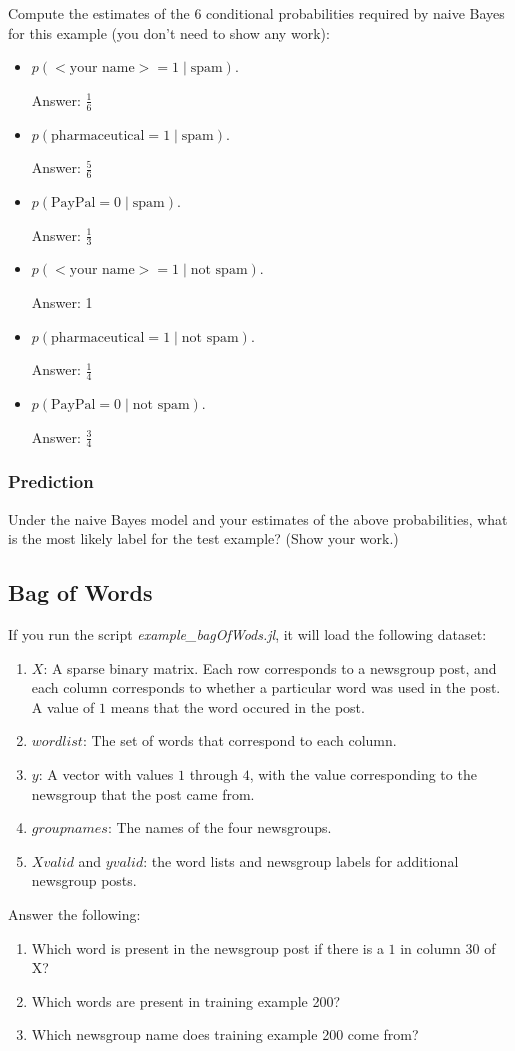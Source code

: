 \documentclass{article}
\def\ans#1{\par\gre{Answer: #1}}
\def\blu#1{{\color{blu}#1}}
\def\gre#1{{\color{gre}#1}}
\def\cond{\; | \;}
\def\items#1{\begin{itemize}#1\end{itemize}}
\def\enum#1{\begin{enumerate}#1\end{enumerate}}
\begin{document}
\blu{Compute the estimates of the 6 conditional probabilities required by naive Bayes for this example}  (you don't need to show any work):
\items{
\item $p(\text{$<$your name$>$} = 1  \cond \text{spam})$.
	\ans{$\frac{1}{6}$}
\item $p(\text{pharmaceutical} = 1 \cond \text{spam})$.
	\ans{$\frac{5}{6}$}
\item $p(\text{PayPal} = 0  \cond \text{spam})$.
	\ans{$\frac{1}{3}$}
\item $p(\text{$<$your name$>$} = 1  \cond \text{not spam})$.
	\ans{1}
\item $p(\text{pharmaceutical} = 1  \cond \text{not spam})$.
	\ans{$\frac{1}{4}$}
\item $p(\text{PayPal} = 0  \cond \text{not spam})$.
	\ans{$\frac{3}{4}$}
}

\subsubsection{Prediction}


\blu{Under the naive Bayes model and your estimates of the above probabilities, what is the most likely label for the test example? (Show your work.)}


\subsection{Bag of Words}

If you run the script \emph{example\_bagOfWods.jl}, it will load the following dataset:
\enum{
\item $X$: A sparse binary matrix. Each row corresponds to a newsgroup post, and each column corresponds to whether a particular word was used in the post. A value of $1$ means that the word occured in the post.
\item $wordlist$: The set of words that correspond to each column.
\item $y$: A vector with values $1$ through $4$, with the value corresponding to the newsgroup that the post came from.
\item $groupnames$: The names of the four newsgroups.
\item $Xvalid$ and $yvalid$: the word lists and newsgroup labels for additional newsgroup posts.
}
\blu{Answer the following}:
\enum{
\item Which word is present in the newsgroup post if there is a $1$ in column 30 of X?
\item Which words are present in training example 200?
\item Which newsgroup name does training example 200 come from?
}
\end{document}
